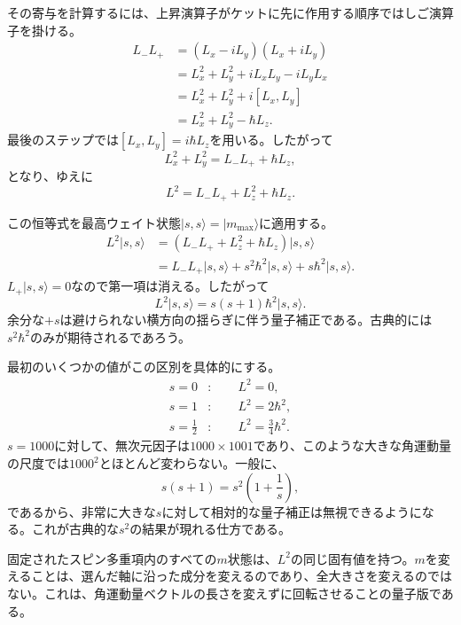 その寄与を計算するには、上昇演算子がケットに先に作用する順序ではしご演算子を掛ける。
\begin{align}
L_-L_+
&=(L_x-iL_y)(L_x+iL_y) \\
&=L_x^2+L_y^2+iL_xL_y-iL_yL_x \\
&=L_x^2+L_y^2+i[L_x,L_y] \\
&=L_x^2+L_y^2-\hbar L_z.
\end{align}
最後のステップでは\([L_x,L_y]=i\hbar L_z\)を用いる。したがって
\begin{equation}
L_x^2+L_y^2=L_-L_++\hbar L_z,
\end{equation}
となり、ゆえに
\begin{equation}
L^2=L_-L_++L_z^2+\hbar L_z.
\end{equation}

この恒等式を最高ウェイト状態\(\lvert s,s\rangle=\lvert m_{\max}\rangle\)に適用する。
\begin{align}
L^2\lvert s,s\rangle
&=\left(L_-L_++L_z^2+\hbar L_z\right)\lvert s,s\rangle \\
&=L_-L_+\lvert s,s\rangle
+s^2\hbar^2\lvert s,s\rangle
+s\hbar^2\lvert s,s\rangle.
\end{align}
\(L_+\lvert s,s\rangle=0\)なので第一項は消える。したがって
\begin{equation}
L^2\lvert s,s\rangle
=s(s+1)\hbar^2\lvert s,s\rangle.
\end{equation}
余分な\(+s\)は避けられない横方向の揺らぎに伴う量子補正である。古典的には\(s^2\hbar^2\)のみが期待されるであろう。

最初のいくつかの値がこの区別を具体的にする。
\begin{align}
s=0 &: \qquad L^2=0,\\
s=1 &: \qquad L^2=2\hbar^2,\\
s=\frac12 &: \qquad L^2=\frac34\hbar^2.
\end{align}
\(s=1000\)に対して、無次元因子は\(1000\times1001\)であり、このような大きな角運動量の尺度では\(1000^2\)とほとんど変わらない。一般に、
\begin{equation}
s(s+1)=s^2\left(1+\frac1s\right),
\end{equation}
であるから、非常に大きな\(s\)に対して相対的な量子補正は無視できるようになる。これが古典的な\(s^2\)の結果が現れる仕方である。

固定されたスピン多重項内のすべての\(m\)状態は、\(L^2\)の同じ固有値を持つ。\(m\)を変えることは、選んだ軸に沿った成分を変えるのであり、全大きさを変えるのではない。これは、角運動量ベクトルの長さを変えずに回転させることの量子版である。


